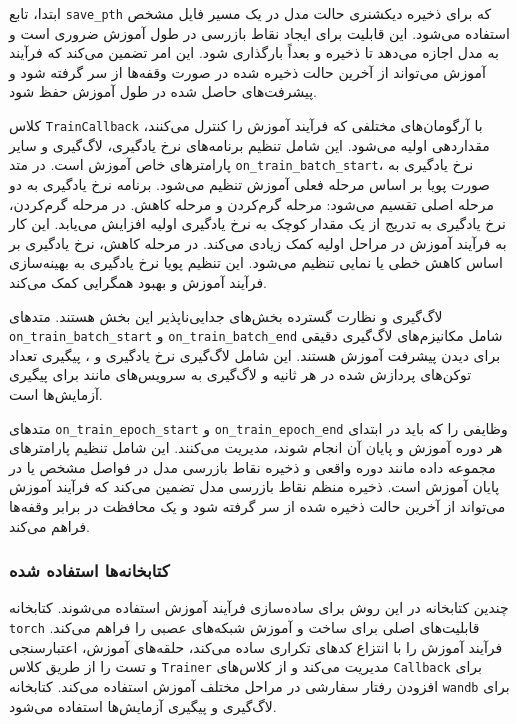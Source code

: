 ابتدا، تابع \texttt{save\_pth}  که برای ذخیره دیکشنری حالت
مدل در یک مسیر فایل مشخص استفاده می‌شود. این قابلیت برای ایجاد نقاط
بازرسی در طول آموزش ضروری است و به مدل اجازه می‌دهد تا ذخیره و بعداً
بارگذاری شود. این امر تضمین می‌کند که فرآیند آموزش می‌تواند از آخرین حالت
ذخیره شده در صورت وقفه‌ها از سر گرفته شود و پیشرفت‌های حاصل شده در طول
آموزش حفظ شود.

کلاس \texttt{TrainCallback} با آرگومان‌های مختلفی که فرآیند آموزش را
کنترل می‌کنند، مقداردهی اولیه می‌شود. این شامل تنظیم برنامه‌های نرخ
یادگیری، لاگ‌گیری و سایر پارامترهای خاص آموزش است. در متد
\texttt{on\_train\_batch\_start}، نرخ یادگیری به صورت پویا بر اساس مرحله
فعلی آموزش تنظیم می‌شود. برنامه نرخ یادگیری به دو مرحله اصلی تقسیم می‌شود:
مرحله گرم‌کردن  و مرحله کاهش. در مرحله گرم‌کردن، نرخ یادگیری به تدریج از یک
مقدار کوچک به نرخ یادگیری اولیه افزایش می‌یابد. این کار به فرآیند
آموزش در مراحل اولیه کمک زیادی می‌کند. در مرحله کاهش، نرخ یادگیری بر اساس کاهش
خطی یا نمایی تنظیم می‌شود. این تنظیم پویا نرخ
یادگیری به بهینه‌سازی فرآیند آموزش و بهبود همگرایی کمک می‌کند.

لاگ‌گیری و نظارت گسترده بخش‌های جدایی‌ناپذیر این بخش هستند. متدهای
\texttt{on\_train\_batch\_start} و \texttt{on\_train\_batch\_end} شامل
مکانیزم‌های لاگ‌گیری دقیقی برای دیدن پیشرفت آموزش هستند. این شامل
لاگ‌گیری نرخ یادگیری و ، پیگیری تعداد توکن‌های پردازش شده در هر
ثانیه و لاگ‌گیری به سرویس‌های مانند  \cite{wandb} برای
پیگیری آزمایش‌ها است.

متدهای \texttt{on\_train\_epoch\_start} و \texttt{on\_train\_epoch\_end}
وظایفی را که باید در ابتدای هر دوره آموزش و پایان آن انجام شوند، مدیریت
می‌کنند. این شامل تنظیم پارامترهای مجموعه داده مانند دوره
واقعی و ذخیره نقاط بازرسی مدل در فواصل مشخص یا در پایان آموزش است. ذخیره
منظم نقاط بازرسی مدل تضمین می‌کند که فرآیند آموزش می‌تواند از آخرین حالت
ذخیره شده از سر گرفته شود و یک محافظت در برابر وقفه‌ها فراهم می‌کند.

\subsubsection{کتابخانه‌ها استفاده شده}
چندین کتابخانه در این روش برای ساده‌سازی فرآیند آموزش استفاده می‌شوند.
کتابخانه \texttt{torch} \cite{paszke2017automatic}  قابلیت‌های اصلی برای ساخت و آموزش
شبکه‌های عصبی را فراهم می‌کند.  \cite{Falcon_PyTorch_Lightning_2019} فرآیند آموزش را با انتزاع
کدهای تکراری ساده می‌کند، حلقه‌های آموزش، اعتبارسنجی و تست را از طریق کلاس
\texttt{Trainer} مدیریت می‌کند و از کلاس‌های \texttt{Callback} برای افزودن
رفتار سفارشی در مراحل مختلف آموزش استفاده می‌کند. کتابخانه \texttt{wandb}
برای لاگ‌گیری و پیگیری آزمایش‌ها استفاده می‌شود.

